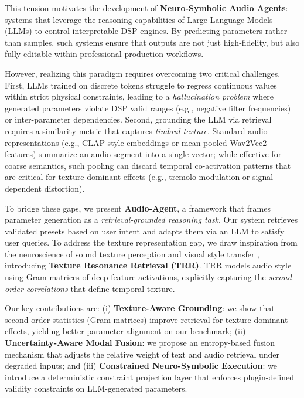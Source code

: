 \documentclass{article}
\begin{document}
This tension motivates the development of \textbf{Neuro-Symbolic Audio Agents}: systems that leverage the reasoning capabilities of Large Language Models (LLMs) to control interpretable DSP engines. By predicting parameters rather than samples, such systems ensure that outputs are not just high-fidelity, but also fully editable within professional production workflows.

However, realizing this paradigm requires overcoming two critical challenges. First, LLMs trained on discrete tokens struggle to regress continuous values within strict physical constraints, leading to a \textit{hallucination problem} where generated parameters violate DSP valid ranges (e.g., negative filter frequencies) or inter-parameter dependencies. Second, grounding the LLM via retrieval requires a similarity metric that captures \textit{timbral texture}. Standard audio representations (e.g., CLAP-style embeddings or mean-pooled Wav2Vec2 features) summarize an audio segment into a single vector; while effective for coarse semantics, such pooling can discard temporal co-activation patterns that are critical for texture-dominant effects (e.g., tremolo modulation or signal-dependent distortion).

To bridge these gaps, we present \textbf{Audio-Agent}, a framework that frames parameter generation as a \textit{retrieval-grounded reasoning task}. Our system retrieves validated presets based on user intent and adapts them via an LLM to satisfy user queries. To address the texture representation gap, we draw inspiration from the neuroscience of sound texture perception \citep{mcdermott2011sound} and visual style transfer \citep{gatys2015style}, introducing \textbf{Texture Resonance Retrieval (TRR)}. TRR models audio style using Gram matrices of deep feature activations, explicitly capturing the \textit{second-order correlations} that define temporal texture.

Our key contributions are: (i) \textbf{Texture-Aware Grounding}: we show that second-order statistics (Gram matrices) improve retrieval for texture-dominant effects, yielding better parameter alignment on our benchmark; (ii) \textbf{Uncertainty-Aware Modal Fusion}: we propose an entropy-based fusion mechanism that adjusts the relative weight of text and audio retrieval under degraded inputs; and (iii) \textbf{Constrained Neuro-Symbolic Execution}: we introduce a deterministic constraint projection layer that enforces plugin-defined validity constraints on LLM-generated parameters.
\end{document}

